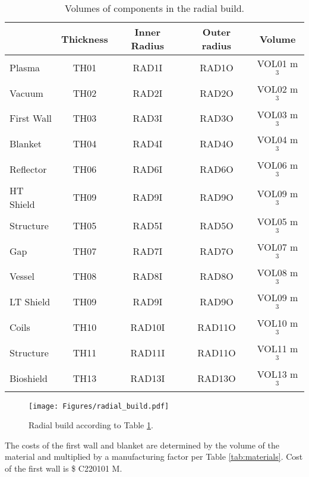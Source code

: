 \begin{table}[h!]
    \centering
    \begin{tabular}{l c  c c c}
    \hline
        &	Thickness	&	Inner Radius	&	Outer radius	&	Volume		\\
        \hline
Plasma	&	TH01	&	RAD1I	&	RAD1O	&	VOL01	m$^{3}$	\\
Vacuum	&	TH02	&	RAD2I	&	RAD2O	&	VOL02	m$^{3}$	\\
First Wall	&	TH03	&	RAD3I	&	RAD3O	&	VOL03	m$^{3}$	\\
Blanket	&	TH04	&	RAD4I	&	RAD4O	&	VOL04	m$^{3}$	\\
Reflector	&	TH06	&	RAD6I	&	RAD6O	&	VOL06	m$^{3}$	\\
HT Shield	&	TH09	&	RAD9I	&	RAD9O	&	VOL09	m$^{3}$	\\
Structure	&	TH05	&	RAD5I	&	RAD5O	&	VOL05	m$^{3}$	\\
Gap	&	TH07	&	RAD7I	&	RAD7O	&	VOL07	m$^{3}$	\\
Vessel	&	TH08	&	RAD8I	&	RAD8O	&	VOL08	m$^{3}$	\\
LT Shield	&	TH09	&	RAD9I	&	RAD9O	&	VOL09	m$^{3}$	\\
Coils	&	TH10	&	RAD10I	&	RAD11O	&	VOL10	m$^{3}$	\\
Structure	&	TH11	&	RAD11I	&	RAD11O	&	VOL11	m$^{3}$	\\
Bioshield	&	TH13	&	RAD13I	&	RAD13O	&	VOL13	m$^{3}$	\\

        \hline
    \end{tabular}
    \caption{Volumes of components in the radial build.}
    \label{tab:volumes}
\end{table}

\begin{figure}
    \centering
    \texttt{[image: Figures/radial\_build.pdf]}
    \caption{Radial build according to Table \ref{tab:volumes}.}
    \label{fig:radial}
\end{figure}



The costs of the first wall and blanket are determined by the volume of the material and multiplied by a manufacturing factor per Table \ref{tab:materials}.   Cost of the first wall is \$ C220101 M.


